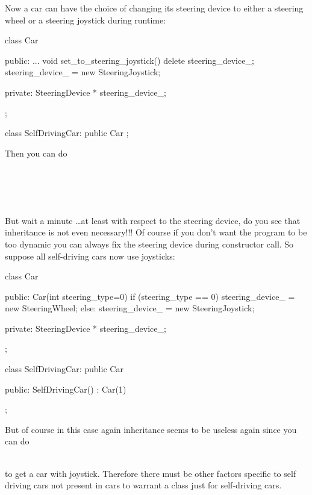 Now a car can have the choice of changing its steering device to either
a steering wheel or a steering joystick during runtime:
\begin{console}
class Car
{
public:
     ...
     void set_to_steering_joystick()
     {   
         delete steering_device_;
         steering_device_ = new SteeringJoystick;
     }

private:
     SteeringDevice * steering_device_;
};

class SelfDrivingCar: public Car
{};
\end{console}
Then you can do

\\
\\
\\
\\

But wait a minute \ldots at least with respect to the steering device, do you see that inheritance is not even necessary!!! Of course if you don't want the program to be too dynamic you can always fix the steering device during constructor call. So suppose all self-driving cars now use joysticks:
\begin{console}
class Car
{
public:
     Car(int steering_type=0)
     {   
         if (steering_type == 0)
            steering_device_ =
                new SteeringWheel;
         else:
            steering_device_ =
                new SteeringJoystick;
     }

private:
     SteeringDevice * steering_device_;

};

class SelfDrivingCar: public Car
{

public:
     SelfDrivingCar()
     : Car(1)
     {}
};
\end{console}
But of course in this case again inheritance seems to be useless again
since you can do

\\

to get a car with joystick. Therefore there must be other factors specific to self driving cars not present in cars to warrant a class just for self-driving cars.
